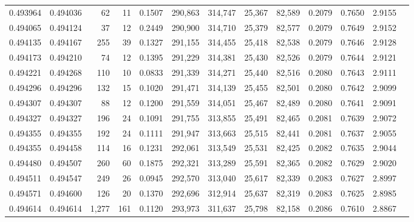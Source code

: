 \begin{tabular}{rrrrrrrrrrrrr}
0.493964 & 0.494036 &    62 &    11 &                                     0.1507 & 290,863 & 314,747 &  25,367 &  82,589 & 0.2079 & 0.7650 & 2.9155 \\
0.494065 & 0.494124 &    37 &    12 &                                     0.2449 & 290,900 & 314,710 &  25,379 &  82,577 & 0.2079 & 0.7649 & 2.9152 \\
0.494135 & 0.494167 &   255 &    39 &                                     0.1327 & 291,155 & 314,455 &  25,418 &  82,538 & 0.2079 & 0.7646 & 2.9128 \\
0.494173 & 0.494210 &    74 &    12 &                                     0.1395 & 291,229 & 314,381 &  25,430 &  82,526 & 0.2079 & 0.7644 & 2.9121 \\
0.494221 & 0.494268 &   110 &    10 &                                     0.0833 & 291,339 & 314,271 &  25,440 &  82,516 & 0.2080 & 0.7643 & 2.9111 \\
0.494296 & 0.494296 &   132 &    15 &                                     0.1020 & 291,471 & 314,139 &  25,455 &  82,501 & 0.2080 & 0.7642 & 2.9099 \\
0.494307 & 0.494307 &    88 &    12 &                                     0.1200 & 291,559 & 314,051 &  25,467 &  82,489 & 0.2080 & 0.7641 & 2.9091 \\
0.494327 & 0.494327 &   196 &    24 &                                     0.1091 & 291,755 & 313,855 &  25,491 &  82,465 & 0.2081 & 0.7639 & 2.9072 \\
0.494355 & 0.494355 &   192 &    24 &                                     0.1111 & 291,947 & 313,663 &  25,515 &  82,441 & 0.2081 & 0.7637 & 2.9055 \\
0.494355 & 0.494458 &   114 &    16 &                                     0.1231 & 292,061 & 313,549 &  25,531 &  82,425 & 0.2082 & 0.7635 & 2.9044 \\
0.494480 & 0.494507 &   260 &    60 &                                     0.1875 & 292,321 & 313,289 &  25,591 &  82,365 & 0.2082 & 0.7629 & 2.9020 \\
0.494511 & 0.494547 &   249 &    26 &                                     0.0945 & 292,570 & 313,040 &  25,617 &  82,339 & 0.2083 & 0.7627 & 2.8997 \\
0.494571 & 0.494600 &   126 &    20 &                                     0.1370 & 292,696 & 312,914 &  25,637 &  82,319 & 0.2083 & 0.7625 & 2.8985 \\
0.494614 & 0.494614 & 1,277 &   161 &                                     0.1120 & 293,973 & 311,637 &  25,798 &  82,158 & 0.2086 & 0.7610 & 2.8867 \\

\end{tabular}
